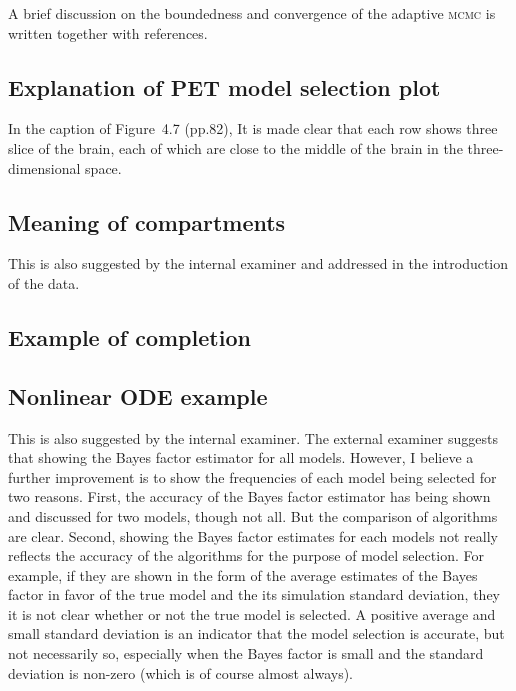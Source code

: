 \documentclass[11pt, fontset=Scala]{marticle}
\begin{document}
A brief discussion on the boundedness and convergence of the adaptive \textsc{mcmc} is written together with references.


\subsection{Explanation of PET model selection plot} %
\label{sub:explanation_of_pet_model_selection_plot}

In the caption of Figure~4.7 (pp.82), It is made clear that each row shows three slice of the brain, each of which are close to the middle of the brain in the three-dimensional space.


\subsection{Meaning of compartments} %
\label{sub:meaning_of_compartments}

This is also suggested by the internal examiner and addressed in the introduction of the data.


\subsection{Example of completion} %
\label{sub:example_of_completion}


\subsection{Nonlinear ODE example} %
\label{sub:nonlinear_ode_example}

This is also suggested by the internal examiner. The external examiner suggests that showing the Bayes factor estimator for all models. However, I believe a further improvement is to show the frequencies of each model being selected for two reasons. First, the accuracy of the Bayes factor estimator has being shown and discussed for two models, though not all. But the comparison of algorithms are clear. Second, showing the Bayes factor estimates for each models not really reflects the accuracy of the algorithms for the purpose of model selection. For example, if they are shown in the form of the average estimates of the Bayes factor in favor of the true model and the its simulation standard deviation, they it is not clear whether or not the true model is selected. A positive average and small standard deviation is an indicator that the model selection is accurate, but not necessarily so, especially when the Bayes factor is small and the standard deviation is non-zero (which is of course almost always).
\end{document}
